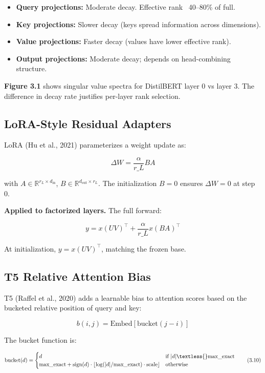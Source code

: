 \begin{itemize}
\item \textbf{Query projections:} Moderate decay. Effective rank ~40--80\% of full.
\item \textbf{Key projections:} Slower decay (keys spread information across dimensions).
\item \textbf{Value projections:} Faster decay (values have lower effective rank).
\item \textbf{Output projections:} Moderate decay; depends on head-combining structure.

\end{itemize}
\textbf{Figure 3.1} shows singular value spectra for DistilBERT layer 0 vs layer 3. 
The difference in decay rate justifies per-layer rank selection.

\subsection{LoRA-Style Residual Adapters}

LoRA (Hu et al., 2021) parameterizes a weight update as:

\[
\Delta W = \frac{\alpha}{r\_L} B A
\tag{3.7}
\]

with $A \in \mathbb{R}^{r_L \times d_\text{in}}$, $B \in \mathbb{R}^{d_\text{out} \times r_L}$. 
The initialization $B = 0$ ensures $\Delta W = 0$ at step 0.

\textbf{Applied to factorized layers.} The full forward:

\[
y = x (U V)^\top + \frac{\alpha}{r\_L} x (B A)^\top
\tag{3.8}
\]

At initialization, $y = x (U V)^\top$, matching the frozen base.

\subsection{T5 Relative Attention Bias}

T5 (Raffel et al., 2020) adds a learnable bias to attention scores based on 
the bucketed relative position of query and key:

\[
b(i, j) = \text{Embed}[\text{bucket}(j - i)]
\tag{3.9}
\]

The bucket function is:

\[
\text{bucket}(d) = \begin{cases}
d & \text{if } |d| \textless{} \text{max\_exact} \\
\text{max\_exact} + \text{sign}(d) \cdot \lfloor \log(|d| / \text{max\_exact}) \cdot \text{scale} \rfloor & \text{otherwise}
\end{cases}
\tag{3.10}
\]

